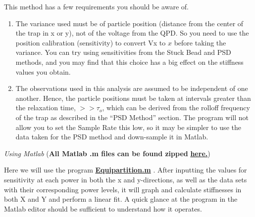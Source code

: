 \documentclass{../lab}
\begin{document}
This method has a few requirements you should be aware of.

\begin{enumerate}
    \item The variance used must be of particle position (distance from the center of the trap in x or y), not of the voltage from the QPD. So you need to use the position calibration (sensitivity) to convert Vx to $ x $ before taking the variance. You can try using sensitivities from the Stuck Bead and PSD methods, and you may find that this choice has a big effect on the stiffness values you obtain.

    \item The observations used in this analysis are assumed to be independent of one another. Hence, the particle positions must be taken at intervals greater than the relaxation time, $ >>\tau_o $, which can be derived from the rolloff frequency of the trap as described in the ``PSD Method'' section. The program will not allow you to set the Sample Rate this low, so it may be simpler to use the data taken for the PSD method and down-sample it in Matlab.

\end{enumerate}

\emph{Using Matlab } (\textbf{All Matlab .m files can be found zipped }\href{http://dev-physicsadv.pantheon.berkeley.edu/sites/default/files/ZIP\_files/OTZ\_Matlab\_files.zip}{\textbf{here.}})

Here we will use the program \href{http://dev-physicsadv.pantheon.berkeley.edu/sites/default/files/matlab\_fitting/Equipartition.m}{\textbf{Equipartition.m}} . After inputting the values for sensitivity at each power in both the x and y-directions, as well as the data sets with their corresponding power levels, it will graph and calculate stiffnesses in both X and Y and perform a linear fit. A quick glance at the program in the Matlab editor should be sufficient to understand how it operates.
\end{document}
